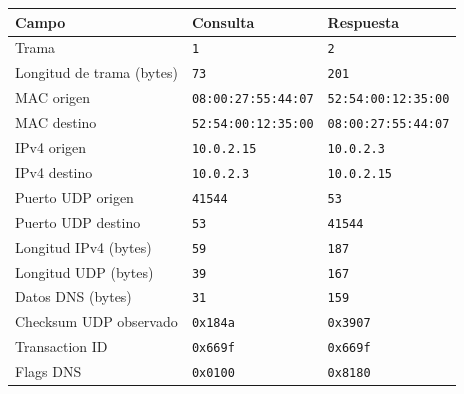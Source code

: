 \begin{tabularx}{\textwidth}{Xll}
\toprule
Campo & Consulta & Respuesta \\
\midrule
Trama & \texttt{1} & \texttt{2} \\
Longitud de trama (bytes) & \texttt{73} & \texttt{201} \\
MAC origen & \texttt{08:00:27:55:44:07} & \texttt{52:54:00:12:35:00} \\
MAC destino & \texttt{52:54:00:12:35:00} & \texttt{08:00:27:55:44:07} \\
IPv4 origen & \texttt{10.0.2.15} & \texttt{10.0.2.3} \\
IPv4 destino & \texttt{10.0.2.3} & \texttt{10.0.2.15} \\
Puerto UDP origen & \texttt{41544} & \texttt{53} \\
Puerto UDP destino & \texttt{53} & \texttt{41544} \\
Longitud IPv4 (bytes) & \texttt{59} & \texttt{187} \\
Longitud UDP (bytes) & \texttt{39} & \texttt{167} \\
Datos DNS (bytes) & \texttt{31} & \texttt{159} \\
Checksum UDP observado & \texttt{0x184a} & \texttt{0x3907} \\
Transaction ID & \texttt{0x669f} & \texttt{0x669f} \\
Flags DNS & \texttt{0x0100} & \texttt{0x8180} \\
\bottomrule
\end{tabularx}
